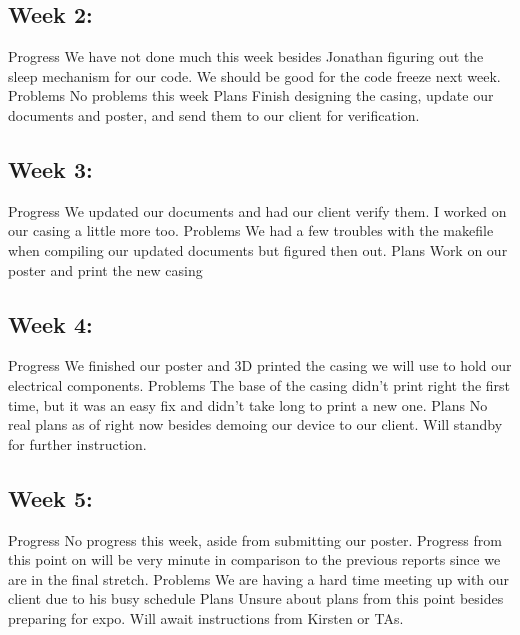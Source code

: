 \documentclass[letterpaper,10pt,draftclsnofoot,onecolumn]{article}
\begin{document}
\subsection{Week 2:}
Progress
We have not done much this week besides Jonathan figuring out the sleep mechanism for our code. We should be good for the code freeze next week.
\newline
Problems
No problems this week
\newline
Plans
Finish designing the casing, update our documents and poster, and send them to our client for verification.
 
\subsection{Week 3:}
Progress
We updated our documents and had our client verify them. I worked on our casing a little more too.
\newline
Problems
We had a few troubles with the makefile when compiling our updated documents but figured then out.
\newline
Plans
Work on our poster and print the new casing
 
\subsection{Week 4:}
Progress
We finished our poster and 3D printed the casing we will use to hold our electrical components.
\newline
Problems
The base of the casing didn't print right the first time, but it was an easy fix and didn't take long to print a new one.
\newline
Plans
No real plans as of right now besides demoing our device to our client. Will standby for further instruction.
 
\subsection{Week 5:}
Progress
No progress this week, aside from submitting our poster. Progress from this point on will be very minute in comparison to the previous reports since we are in the final stretch.
\newline 
Problems
We are having a hard time meeting up with our client due to his busy schedule
\newline
Plans
Unsure about plans from this point besides preparing for expo. Will await instructions from Kirsten or TAs.
 
\end{document}
